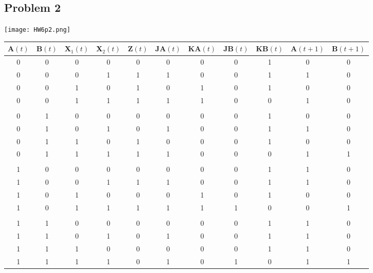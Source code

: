 \documentclass[a4paper,man,natbib]{apa6}
\begin{document}
\subsection{Problem 2}
\texttt{[image: HW6p2.png]}
\begin{tabular}{ c c c c | c | c c c c | c c }
	A$(t)$ & B$(t)$ & X$_1 (t)$ & X$_2 (t)$ & Z$(t)$ & JA$(t)$ & KA$(t)$ & JB$(t)$ & KB$(t)$ & A$(t+1)$ & B$(t+1)$ \\
	\hline
	  0    &   0    &     0     &     0     &   0    &    0    &    0    &    0    &    1    &    0     &  0 \\
	  0    &   0    &     0     &     1     &   1    &    1    &    0    &    0    &    1    &    1     &  0 \\
	  0    &   0    &     1     &     0     &   1    &    0    &    1    &    0    &    1    &    0     &  0 \\
	  0    &   0    &     1     &     1     &   1    &    1    &    1    &    0    &    0    &    1     &  0 \\
	&&&&&&&&&&\\	      
	  0    &   1    &     0     &     0     &   0    &    0    &    0    &    0    &    1    &    0     &  0 \\
	  0    &   1    &     0     &     1     &   0    &    1    &    0    &    0    &    1    &    1     &  0 \\
	  0    &   1    &     1     &     0     &   1    &    0    &    0    &    0    &    1    &    0     &  0 \\
	  0    &   1    &     1     &     1     &   1    &    1    &    0    &    0    &    0    &    1     &  1 \\
	&&&&&&&&&&\\     
	  1    &   0    &     0     &     0     &   0    &    0    &    0    &    0    &    1    &    1     &  0 \\
	  1    &   0    &     0     &     1     &   1    &    1    &    0    &    0    &    1    &    1     &  0 \\
	  1    &   0    &     1     &     0     &   0    &    0    &    1    &    0    &    1    &    0     &  0 \\
	  1    &   0    &     1     &     1     &   1    &    1    &    1    &    1    &    0    &    0     &  1 \\
	&&&&&&&&&&\\
	  1    &   1    &     0     &     0     &   0    &    0    &    0    &    0    &    1    &    1     &  0 \\
	  1	   &   1    &     0     &     1     &   0    &    1    &    0    &    0    &    1    &    1     &  0 \\
	  1	   &   1    &     1     &     0     &   0    &    0    &    0    &    0    &    1    &    1     &  0 \\
	  1    &   1    &     1     &     1     &   0    &    1    &    0    &    1    &    0    &    1     &  1 \\
\end{tabular}
\clearpage
\end{document}
